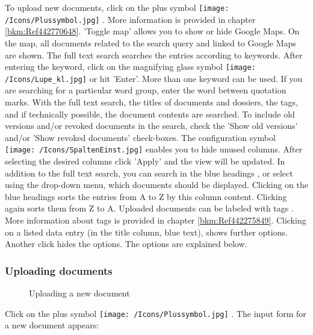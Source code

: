 To upload new documents, click on the plus symbol \texttt{[image: /Icons/Plussymbol.jpg]} . More information is provided in chapter \ref{bkm:Ref442770648}. 'Toggle map' allows you to show or hide Google Maps. On the map, all documents related to the search query and linked to Google Maps are shown. The full text search  searches the entries according to keywords. After entering the keyword, click on the magnifying glass symbol \texttt{[image: /Icons/Lupe\_kl.jpg]}  or hit 'Enter'. More than one keyword can be used. If you are searching for a particular word group, enter the word between quotation marks. With the full text search, the titles of documents and dossiers, the tags, and if technically possible, the document contents are searched. To include old versions and/or revoked documents in the search, check the 'Show old versions'  and/or 'Show revoked documents'  check-boxes. The configuration symbol \texttt{[image: /Icons/SpaltenEinst.jpg]}  enables you to hide unused columns. After selecting the desired columns click 'Apply' and the view will be updated. \newline
In addition to the full text search, you can search in the blue headings , or select using the drop-down menu, which documents should be displayed. Clicking on the blue headings sorts the entries from A to Z by this column content. Clicking again sorts them from Z to A. \newline
Uploaded documents can be labeled with tags . More information about tags is provided in chapter \ref{bkm:Ref442275849}. \newline
Clicking on a listed data entry  (in the title column, blue text), shows further options. Another click hides the options. The options are explained below.

\subsubsection{Uploading documents}
\label{bkm:Ref442863508}\label{bkm:Ref442787515}\label{bkm:Ref442778397}\label{bkm:Ref442770648}\label{bkm:Ref442769978}

\begin{figure}[H]
\caption{Uploading a new document}
\end{figure}

Click on the plus symbol \texttt{[image: /Icons/Plussymbol.jpg]} . The input form for a new document appears:

